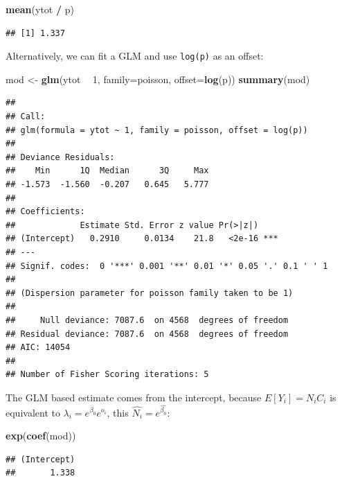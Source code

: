 \documentclass[12pt,]{book}
\newenvironment{Shaded}{\begin{snugshade}}{\end{snugshade}}
\newcommand{\DataTypeTok}[1]{\textcolor[rgb]{0.13,0.29,0.53}{#1}}
\newcommand{\DecValTok}[1]{\textcolor[rgb]{0.00,0.00,0.81}{#1}}
\newcommand{\KeywordTok}[1]{\textcolor[rgb]{0.13,0.29,0.53}{\textbf{#1}}}
\newcommand{\NormalTok}[1]{#1}
\newcommand{\OperatorTok}[1]{\textcolor[rgb]{0.81,0.36,0.00}{\textbf{#1}}}
\newcommand{\StringTok}[1]{\textcolor[rgb]{0.31,0.60,0.02}{#1}}
\begin{document}
\begin{Shaded}
\begin{Highlighting}[]
\KeywordTok{mean}\NormalTok{(ytot }\OperatorTok{/}\StringTok{ }\NormalTok{p)}
\end{Highlighting}
\end{Shaded}

\begin{verbatim}
## [1] 1.337
\end{verbatim}

Alternatively, we can fit a GLM and use \texttt{log(p)} as an offset:

\begin{Shaded}
\begin{Highlighting}[]
\NormalTok{mod <-}\StringTok{ }\KeywordTok{glm}\NormalTok{(ytot }\OperatorTok{~}\StringTok{ }\DecValTok{1}\NormalTok{, }\DataTypeTok{family=}\NormalTok{poisson, }\DataTypeTok{offset=}\KeywordTok{log}\NormalTok{(p))}
\KeywordTok{summary}\NormalTok{(mod)}
\end{Highlighting}
\end{Shaded}

\begin{verbatim}
## 
## Call:
## glm(formula = ytot ~ 1, family = poisson, offset = log(p))
## 
## Deviance Residuals: 
##    Min      1Q  Median      3Q     Max  
## -1.573  -1.560  -0.207   0.645   5.777  
## 
## Coefficients:
##             Estimate Std. Error z value Pr(>|z|)    
## (Intercept)   0.2910     0.0134    21.8   <2e-16 ***
## ---
## Signif. codes:  0 '***' 0.001 '**' 0.01 '*' 0.05 '.' 0.1 ' ' 1
## 
## (Dispersion parameter for poisson family taken to be 1)
## 
##     Null deviance: 7087.6  on 4568  degrees of freedom
## Residual deviance: 7087.6  on 4568  degrees of freedom
## AIC: 14054
## 
## Number of Fisher Scoring iterations: 5
\end{verbatim}

The GLM based estimate comes from the intercept, because
\(E[Y_i]=N_i C_i\) is equivalent to \(\lambda_i=e^{\beta_0} e^{o_i}\),
this \(\hat{N_i}=e^{\hat{\beta_0}}\):

\begin{Shaded}
\begin{Highlighting}[]
\KeywordTok{exp}\NormalTok{(}\KeywordTok{coef}\NormalTok{(mod))}
\end{Highlighting}
\end{Shaded}

\begin{verbatim}
## (Intercept) 
##       1.338
\end{verbatim}
\end{document}
